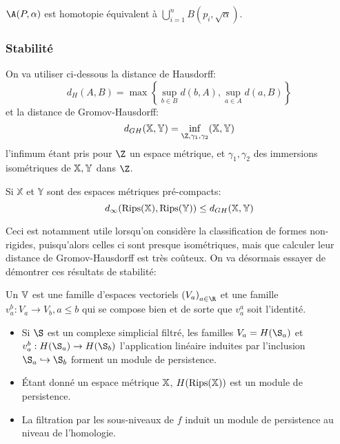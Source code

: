 \begin{thm}
	$\A(P, \alpha)$ est homotopie équivalent à $\bigcup_{i = 1}^{n} B(p_{i}, \sqrt{\alpha})$.
\end{thm}

\subsubsection{Stabilité}

On va utiliser ci-dessous la distance de Hausdorff:
\begin{equation*}
	d_{H}(A, B) = \max \left\{\sup_{b\in B} d(b, A), \sup_{a \in A} d(a, B)\right\}
\end{equation*}
et la distance de Gromov-Hausdorff:
\begin{equation*}
	d_{GH}(\X, \Y) = \inf_{\Z, \gamma_{1}, \gamma_{2}}(\X, \Y)
\end{equation*}
l'infimum étant pris pour $\Z$ un espace métrique, et $\gamma_{1}, \gamma_{2}$ des immersions isométriques de $\mathbb{X}, \mathbb{Y}$ dans $\Z$.


\begin{thm}
	Si $\mathbb{X}$ et $\mathbb{Y}$ sont des espaces métriques pré-compacts:
	\begin{equation*}
		d_{\infty}(\operatorname{Rips}(\mathbb{X}), \operatorname{Rips}(\mathbb{Y})) \leq d_{GH}(\mathbb{X}, \mathbb{Y})
	\end{equation*}
\end{thm}

Ceci est notamment utile lorsqu'on considère la classification de formes non-rigides, puisqu'alors celles
ci sont presque isométriques, mais que calculer leur distance de Gromov-Hausdorff est très coûteux.
On va désormais essayer de démontrer ces résultats de stabilité:
\begin{definition}
	Un  $\mathbb{V}$ est une famille d'espaces vectoriels $\left(V_{a}\right)_{a\in \R}$ et une famille $v_{a}^{b}: V_{a} \to V_{b}, a \leq b$ qui se compose bien et de sorte que $v_{a}^{a}$ soit l'identité.
\end{definition}
\begin{itemize}
	\item Si $\S$ est un complexe simplicial filtré, les familles $V_{a} = H(\S_{a})$ et $v_{a}^{b}: H(\S_{a}) \to H(\S_{b})$ l'application linéaire induites par l'inclusion $\S_{a} \hookrightarrow \S_{b}$ forment un module de persistence.
	\item Étant donné un espace métrique $\mathbb{X}$, $H(\operatorname{Rips}(\mathbb{X}))$ est un module de persistence.
	\item La filtration par les sous-niveaux de $f$ induit un module de persistence au niveau de l'homologie.
\end{itemize}



